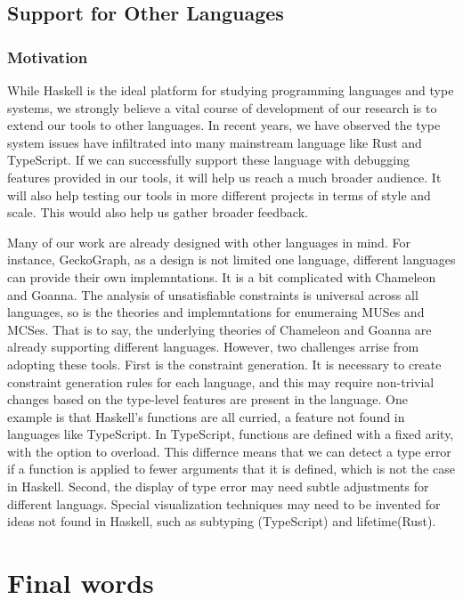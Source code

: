 \subsection{Support for Other Languages}
\subsubsection{Motivation}
While Haskell is the ideal platform for studying programming languages and type systems, we strongly believe a vital course of development of our research is to extend our tools to other languages. In recent years, we have observed the type system issues have infiltrated into many mainstream language like Rust and TypeScript. If we can successfully support these language with debugging features provided in our tools, it will help us reach a much broader audience. It will also help testing our tools in more different projects in terms of style and scale.   This would also help us gather broader feedback.   

Many of  our work are already designed with other languages in mind. For instance, GeckoGraph, as a design is not limited one language, different languages can provide their own implemntations. It is a bit complicated with Chameleon and Goanna. The analysis of unsatisfiable constraints is universal across all languages, so is the theories and implemntations for enumeraing MUSes and MCSes.
That is to say, the underlying theories of Chameleon and Goanna are already supporting different languages. However, two challenges arrise from adopting these tools. First is the constraint generation. It is necessary to create constraint generation rules for each language, and this may require non-trivial changes based on the type-level features are present in the language. One example is that Haskell's functions are all curried, a feature not found in languages like TypeScript. In TypeScript, functions are defined with a fixed arity, with the option to overload. This differnce means that we can detect a type error if a function is applied to fewer arguments that it is defined, which is not the case in Haskell.   Second, the display of type error may need subtle adjustments for different languags. Special visualization techniques may need to be invented for ideas not found in Haskell, such as subtyping (TypeScript) and lifetime(Rust). 



\section{Final words}

